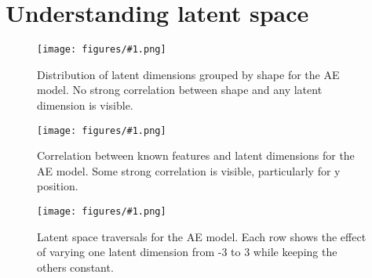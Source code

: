 \documentclass[conference,a4paper]{IEEEtran}
\newcommand{\centerfigure}[2]{
    \begin{figure}[htbp]
        \centering
        \caption{#2}
        \texttt{[image: figures/\#1.png]}
        \label{fig:#1}
    \end{figure}
}
\begin{document}
\section{Understanding latent space}

\centerfigure{ae-latent-by-shape}{Distribution of latent dimensions grouped by shape for the AE model. No strong correlation between shape and any latent dimension is visible.}

\centerfigure{ae-latent-corelation}{Correlation between known features and latent dimensions for the AE model. Some strong correlation is visible, particularly for y position.}

\centerfigure{ae-traversal-1}{Latent space traversals for the AE model. Each row shows the effect of varying one latent dimension from -3 to 3 while keeping the others constant.}
\end{document}

